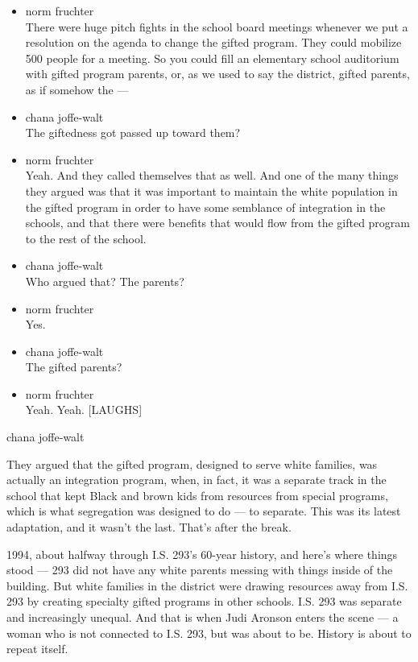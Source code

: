 \begin{itemize}
\item
  norm fruchter\\
  There were huge pitch fights in the school board meetings whenever we
  put a resolution on the agenda to change the gifted program. They
  could mobilize 500 people for a meeting. So you could fill an
  elementary school auditorium with gifted program parents, or, as we
  used to say the district, gifted parents, as if somehow the ---
\item
  chana joffe-walt\\
  The giftedness got passed up toward them?
\item
  norm fruchter\\
  Yeah. And they called themselves that as well. And one of the many
  things they argued was that it was important to maintain the white
  population in the gifted program in order to have some semblance of
  integration in the schools, and that there were benefits that would
  flow from the gifted program to the rest of the school.
\item
  chana joffe-walt\\
  Who argued that? The parents?
\item
  norm fruchter\\
  Yes.
\item
  chana joffe-walt\\
  The gifted parents?
\item
  norm fruchter\\
  Yeah. Yeah. {[}LAUGHS{]}
\end{itemize}

chana joffe-walt

They argued that the gifted program, designed to serve white families,
was actually an integration program, when, in fact, it was a separate
track in the school that kept Black and brown kids from resources from
special programs, which is what segregation was designed to do --- to
separate. This was its latest adaptation, and it wasn't the last. That's
after the break.

1994, about halfway through I.S. 293's 60-year history, and here's where
things stood --- 293 did not have any white parents messing with things
inside of the building. But white families in the district were drawing
resources away from I.S. 293 by creating specialty gifted programs in
other schools. I.S. 293 was separate and increasingly unequal. And that
is when Judi Aronson enters the scene --- a woman who is not connected
to I.S. 293, but was about to be. History is about to repeat itself.

